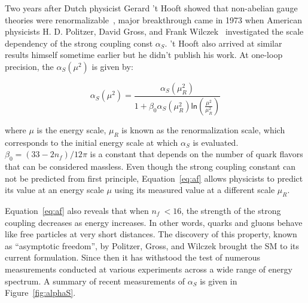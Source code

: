 Two years after Dutch physicist Gerard 't Hooft showed that non-abelian gauge theories were renormalizable~\cite{tHooft:1971akt}, major breakthrough came in 1973 when American physicists H. D. Politzer, David Gross, and Frank Wilczek~\cite{Gross:1973id,Politzer:1973fx} investigated the scale dependency of the strong coupling const $\alpha_{S}$. 't Hooft also arrived at similar results himself sometime earlier but he didn't publish his work. At one-loop precision, the $\alpha_{S}(\mu^2)$ is given by:

\begin{equation}
\label{eq:af}
\alpha_{S}(\mu^2)=\frac{\alpha_{S}(\mu_{R}^2)}{1+\beta_{0}\alpha_{S}(\mu_{R}^2)\textsf{ln}(\frac{\mu^2}{\mu_{R}^2})}
\end{equation}

where $\mu$ is the energy scale, $\mu_{R}$ is known as the renormalization scale, which corresponds to the initial energy scale at which $\alpha_{S}$ is evaluated. $\beta_{0}=(33-2n_{f})/12\pi$ is a constant that depends on the number of quark flavors that can be considered massless. Even though the strong coupling constant can not be predicted from first principle, Equation~\ref{eq:af} allows physicists to predict its value at an energy scale $\mu$ using its measured value at a different scale $\mu_{R}$.

Equation~\ref{eq:af} also reveals that when $n_{f}~<16$, the strength of the strong coupling decreases as energy increases. In other words, quarks and gluons behave like free particles at very short distances. The discovery of this property, known as ``asymptotic freedom'', by Politzer, Gross, and Wilczek brought the \ac{SM} to its current formulation. Since then it has withstood the test of numerous measurements conducted at various experiments across a wide range of energy spectrum. A summary of recent measurements of $\alpha_{S}$ is given in Figure~\ref{fig:alphaS}.

